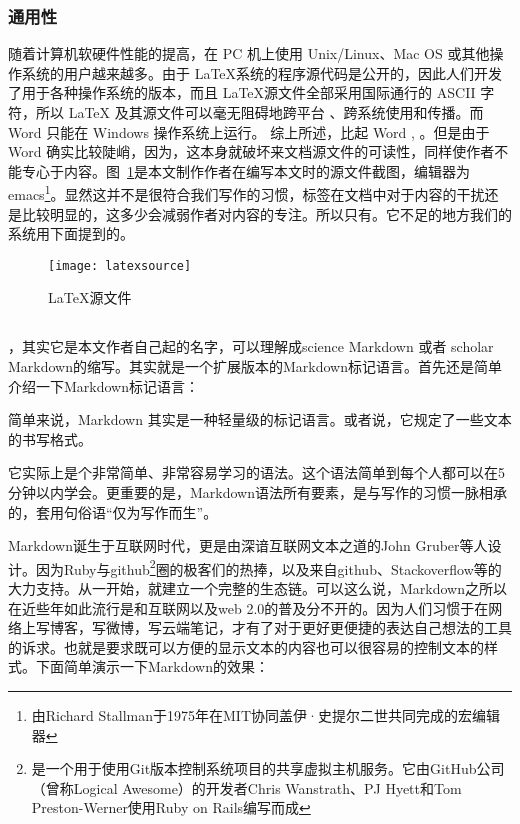 \subsubsection{通用性}
\label{sec:tongyongxing}

随着计算机软硬件性能的提高，在 PC 机上使用 Unix/Linux、Mac OS 或其他操作系统的用户越来越多。由于 \LaTeX 系统的程序源代码是公开的，因此人们开发了用于各种操作系统的版本，而且 \LaTeX 源文件全部采用国际通行的 ASCII 字符，所以 LaTeX 及其源文件可以毫无阻碍地跨平台 、跨系统使用和传播。而 Word 只能在 Windows 操作系统上运行。
综上所述，比起 Word , 。但是由于 Word 确实比较陡峭，因为，这本身就破坏来文档源文件的可读性，同样使作者不能专心于内容。图~\ref{fig:xfig6}是本文制作作者在编写本文时的源文件截图，编辑器为emacs\footnote{由Richard Stallman于1975年在MIT协同盖伊·史提尔二世共同完成的宏编辑器}。显然这并不是很符合我们写作的习惯，标签在文档中对于内容的干扰还是比较明显的，这多少会减弱作者对内容的专注。所以只有。它不足的地方我们的系统用下面提到的。
\begin{figure}[H]
  \centering
  \texttt{[image: latexsource]}
  \caption{LaTeX源文件}
  \label{fig:xfig6}
\end{figure}

\subsection{}
\label{sec:smarkdown}

，其实它是本文作者自己起的名字，可以理解成science Markdown 或者 scholar Markdown的缩写。其实就是一个扩展版本的Markdown标记语言。首先还是简单介绍一下Markdown\cite{abari2012reproducible,rantakari2011adapting}标记语言：

简单来说，Markdown 其实是一种轻量级的标记语言。或者说，它规定了一些文本的书写格式。

它实际上是个非常简单、非常容易学习的语法。这个语法简单到每个人都可以在5分钟以内学会。更重要的是，Markdown语法所有要素，是与写作的习惯一脉相承的，套用句俗语“仅为写作而生”。

Markdown诞生于互联网时代，更是由深谙互联网文本之道的John Gruber等人设计。因为Ruby与github\footnote{是一个用于使用Git版本控制系统项目的共享虚拟主机服务。它由GitHub公司（曾称Logical Awesome）的开发者Chris Wanstrath、PJ Hyett和Tom Preston-Werner使用Ruby on Rails编写而成}圈的极客们的热捧，以及来自github、Stackoverflow等的大力支持。从一开始，就建立一个完整的生态链。可以这么说，Markdown之所以在近些年如此流行是和互联网以及web 2.0的普及分不开的。因为人们习惯于在网络上写博客，写微博，写云端笔记，才有了对于更好更便捷的表达自己想法的工具的诉求。也就是要求既可以方便的显示文本的内容也可以很容易的控制文本的样式。下面简单演示一下Markdown的效果：

